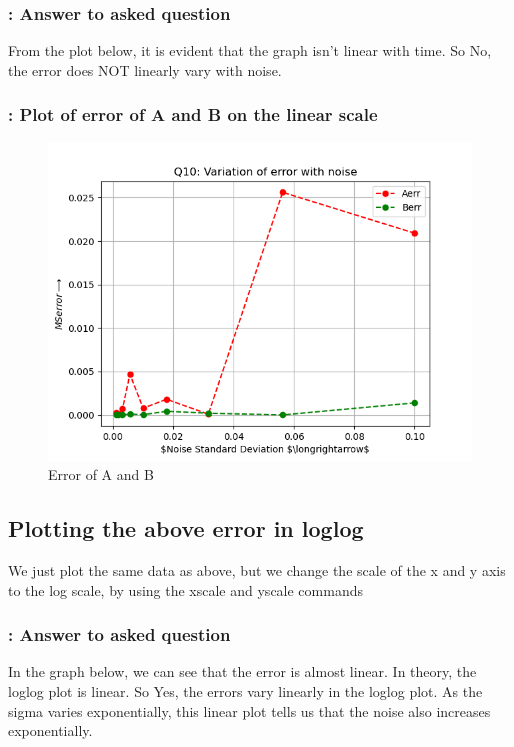 \documentclass[11pt]{article}
\begin{document}
\subsubsection{: Answer to asked question}
From the plot below, it is evident that the graph isn't linear with time. So No, the error does NOT linearly vary with noise.

\subsubsection{: Plot of error of A and B on the linear scale}
\begin{figure}[H]
    \centering
    \includegraphics[scale = 0.75]{Figure_4.png}
    \caption{Error of A and B}
\end{figure}

\subsection{Plotting the above error in loglog}
We just plot the same data as above, but we change the scale of the x and y axis to the log scale, by using the xscale and yscale commands

\subsubsection{: Answer to asked question}
In the graph below, we can see that the error is almost linear. In theory, the loglog plot is linear. So Yes, the errors vary linearly in the loglog plot. As the sigma varies exponentially, this linear plot tells us that the noise also increases exponentially.
\end{document}
